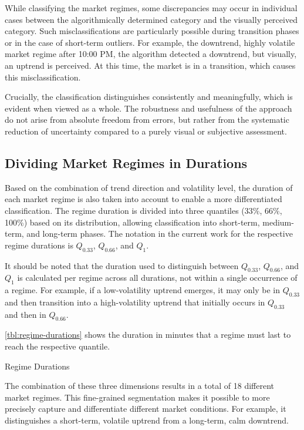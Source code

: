 \noindent
While classifying the market regimes, some discrepancies may occur in individual cases between the algorithmically determined category and the visually perceived category.
Such misclassifications are particularly possible during transition phases or in the case of short-term outliers.
For example, the downtrend, highly volatile market regime after 10:00 PM, the algorithm detected a downtrend, but visually, an uptrend is perceived.
At this time, the market is in a transition, which causes this misclassification.

Crucially, the classification distinguishes consistently and meaningfully, which is evident when viewed as a whole.
The robustness and usefulness of the approach do not arise from absolute freedom from errors, but rather from the systematic reduction of uncertainty compared to a purely visual or subjective assessment.

\subsection{Dividing Market Regimes in Durations}

Based on the combination of trend direction and volatility level, the duration of each market regime is also taken into account to enable a more differentiated classification.
The regime duration is divided into three quantiles (33\%, 66\%, 100\%) based on its distribution, allowing classification into short-term, medium-term, and long-term phases.
The notation in the current work for the respective regime durations is $Q_{0.33}$, $Q_{0.66}$, and $Q_{1}$.

It should be noted that the duration used to distinguish between $Q_{0.33}$, $Q_{0.66}$, and $Q_{1}$ is calculated per regime across all durations, not within a single occurrence of a regime.
For example, if a low-volatility uptrend emerges, it may only be in $Q_{0.33}$ and then transition into a high-volatility uptrend that initially occurs in $Q_{0.33}$ and then in $Q_{0.66}$.

\autoref{tbl:regime-durations} shows the duration in minutes that a regime must last to reach the respective quantile.


\begin{table}[H]
    \centering
    
    \caption{Regime Durations}
    \label{tbl:regime-durations}
\end{table}

\noindent
The combination of these three dimensions results in a total of 18 different market regimes.
This fine-grained segmentation makes it possible to more precisely capture and differentiate different market conditions.
For example, it distinguishes a short-term, volatile uptrend from a long-term, calm downtrend.

